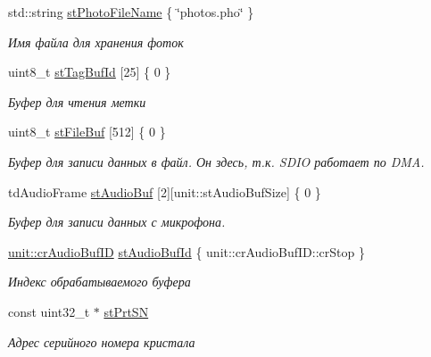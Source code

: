 \begin{DoxyCompactItemize}
\mbox{\label{namespacecommon_a373798ef1a9c0a94b49bc38455d62d10}} 
std\+::string \hyperlink{namespacecommon_a373798ef1a9c0a94b49bc38455d62d10}{st\+Photo\+File\+Name} \{ \char`\"{}photos.\+pho\char`\"{} \}
\begin{DoxyCompactList}\small\item\em Имя файла для хранения фоток \end{DoxyCompactList}\item 
\mbox{\label{namespacecommon_ad9edd5582300fe9f535b3d2f912291bb}} 
uint8\+\_\+t \hyperlink{namespacecommon_ad9edd5582300fe9f535b3d2f912291bb}{st\+Tag\+Buf\+Id} \mbox{[}25\mbox{]} \{ 0 \}
\begin{DoxyCompactList}\small\item\em Буфер для чтения метки \end{DoxyCompactList}\item 
\mbox{\label{namespacecommon_a07e080fe05fc55b6f3eab1de78a1157a}} 
uint8\+\_\+t \hyperlink{namespacecommon_a07e080fe05fc55b6f3eab1de78a1157a}{st\+File\+Buf} \mbox{[}512\mbox{]} \{ 0 \}
\begin{DoxyCompactList}\small\item\em Буфер для записи данных в файл. Он здесь, т.\+к. S\+D\+IO работает по D\+MA. \end{DoxyCompactList}\item 
\mbox{\label{namespacecommon_aeca12b629edac6586f4b0fbcf9617769}} 
td\+Audio\+Frame \hyperlink{namespacecommon_aeca12b629edac6586f4b0fbcf9617769}{st\+Audio\+Buf} \mbox{[}2\mbox{]}\mbox{[}unit\+::st\+Audio\+Buf\+Size\mbox{]} \{ 0 \}
\begin{DoxyCompactList}\small\item\em Буфер для записи данных с микрофона. \end{DoxyCompactList}\item 
\mbox{\label{namespacecommon_a1a1c25124d2328c41042070beb16c208}} 
\hyperlink{group___xD0_x9F_xD0_xB5_xD1_x80_xD0_xB5_xD1_x87_xD0_xB8_xD1_x81_xD0_xBB_xD0_xB5_xD0_xBD_xD0_xB8_xD1_x8F_ga30dd689bff585403e080598b50585936}{unit\+::cr\+Audio\+Buf\+ID} \hyperlink{namespacecommon_a1a1c25124d2328c41042070beb16c208}{st\+Audio\+Buf\+Id} \{ unit\+::cr\+Audio\+Buf\+I\+D\+::cr\+Stop \}
\begin{DoxyCompactList}\small\item\em Индекс обрабатываемого буфера \end{DoxyCompactList}\item 
\mbox{\label{namespacecommon_a516c5010126a38173eacd0de486b662e}} 
const uint32\+\_\+t $\ast$ \hyperlink{namespacecommon_a516c5010126a38173eacd0de486b662e}{st\+Prt\+SN}
\begin{DoxyCompactList}\small\item\em Адрес серийного номера кристала \end{DoxyCompactList}\end{DoxyCompactItemize}


